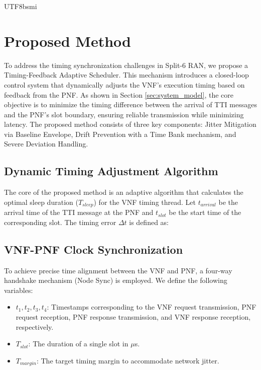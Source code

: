 \documentclass[conference]{IEEEtran}
\begin{document}
\begin{CJK}{UTF8}{bsmi}
\section{Proposed Method}
\label{sec:proposed_method}

{\color{blue}
To address the timing synchronization challenges in Split-6 RAN, we propose a Timing-Feedback Adaptive Scheduler. This mechanism introduces a closed-loop control system that dynamically adjusts the VNF's execution timing based on feedback from the PNF. As shown in Section \ref{sec:system_model}, the core objective is to minimize the timing difference between the arrival of TTI messages and the PNF's slot boundary, ensuring reliable transmission while minimizing latency. The proposed method consists of three key components: Jitter Mitigation via Baseline Envelope, Drift Prevention with a Time Bank mechanism, and Severe Deviation Handling.

\subsection{Dynamic Timing Adjustment Algorithm}
The core of the proposed method is an adaptive algorithm that calculates the optimal sleep duration ($T_{sleep}$) for the VNF timing thread.
Let $t_{arrival}$ be the arrival time of the TTI message at the PNF and $t_{slot}$ be the start time of the corresponding slot. The timing error $\Delta t$ is defined as:
}

\subsection{VNF-PNF Clock Synchronization}
{\color{blue}
To achieve precise time alignment between the VNF and PNF, a four-way handshake mechanism (Node Sync) is employed. We define the following variables:
\begin{itemize}
    \item $t_1, t_2, t_3, t_4$: Timestamps corresponding to the VNF request transmission, PNF request reception, PNF response transmission, and VNF response reception, respectively.
    \item $T_{slot}$: The duration of a single slot in $\mu$s.
    \item $T_{margin}$: The target timing margin to accommodate network jitter.
\end{itemize}

}
\end{CJK}
\end{document}

